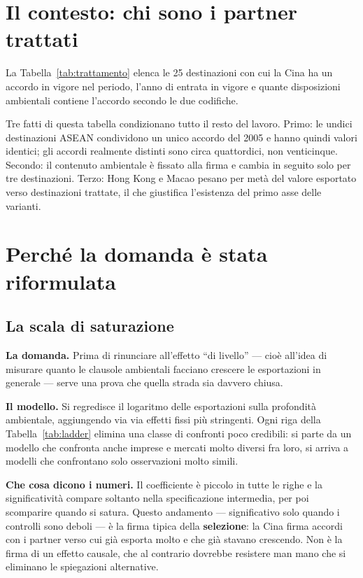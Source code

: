 \documentclass[11pt,a4paper]{article}
\begin{document}
\section{Il contesto: chi sono i partner trattati}

La Tabella~\ref{tab:trattamento} elenca le 25 destinazioni con cui la Cina ha un accordo
in vigore nel periodo, l'anno di entrata in vigore e quante disposizioni ambientali
contiene l'accordo secondo le due codifiche.

Tre fatti di questa tabella condizionano tutto il resto del lavoro. Primo: le undici
destinazioni ASEAN condividono un unico accordo del 2005 e hanno quindi valori identici;
gli accordi realmente distinti sono circa quattordici, non venticinque. Secondo: il
contenuto ambientale \`e fissato alla firma e cambia in seguito solo per tre destinazioni.
Terzo: Hong Kong e Macao pesano per met\`a del valore esportato verso destinazioni
trattate, il che giustifica l'esistenza del primo asse delle varianti.



\clearpage
\section{Perch\'e la domanda \`e stata riformulata}

\subsection{La scala di saturazione}

\textbf{La domanda.} Prima di rinunciare all'effetto ``di livello'' --- cio\`e all'idea di
misurare quanto le clausole ambientali facciano crescere le esportazioni in generale ---
serve una prova che quella strada sia davvero chiusa.

\textbf{Il modello.} Si regredisce il logaritmo delle esportazioni sulla profondit\`a
ambientale, aggiungendo via via effetti fissi pi\`u stringenti. Ogni riga della
Tabella~\ref{tab:ladder} elimina una classe di confronti poco credibili: si parte da un
modello che confronta anche imprese e mercati molto diversi fra loro, si arriva a modelli
che confrontano solo osservazioni molto simili.

\textbf{Che cosa dicono i numeri.} Il coefficiente \`e piccolo in tutte le righe e la
significativit\`a compare soltanto nella specificazione intermedia, per poi scomparire
quando si satura. Questo andamento --- significativo solo quando i controlli sono deboli
--- \`e la firma tipica della \textbf{selezione}: la Cina firma accordi con i partner verso
cui gi\`a esporta molto e che gi\`a stavano crescendo. Non \`e la firma di un effetto
causale, che al contrario dovrebbe resistere man mano che si eliminano le spiegazioni
alternative.
\end{document}
